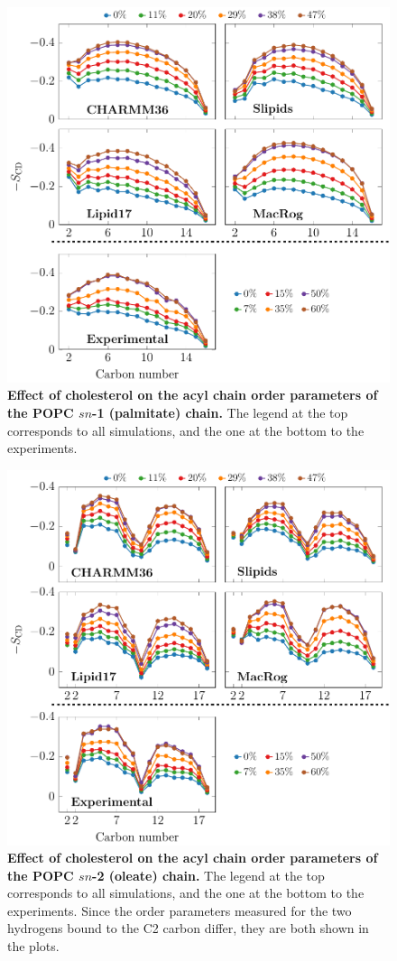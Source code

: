 \documentclass[journal=jpcbfk]{achemso}
\begin{document}
\begin{figure}[htb!]
    \centering
    \includegraphics[width=0.9\linewidth]{../FIGS/palmitate.pdf}
    \caption{\label{SIfig:palmitate}%
     \textbf{Effect of cholesterol on the acyl chain order parameters of the POPC $sn$-1 (palmitate) chain.}
     The legend at the top corresponds to all simulations, and the one at the bottom to the experiments.
    }
\end{figure}

\begin{figure}[htb!]
    \centering
    \includegraphics[width=0.9\linewidth]{../FIGS/oleate.pdf}
    \caption{\label{SIfig:oleate}%
     \textbf{Effect of cholesterol on the acyl chain order parameters of the POPC $sn$-2 (oleate) chain.}
     The legend at the top corresponds to all simulations, and the one at the bottom to the experiments. Since the order parameters measured for the two hydrogens bound to the C2 carbon differ, they are both shown in the plots.
    }
\end{figure}
\end{document}
